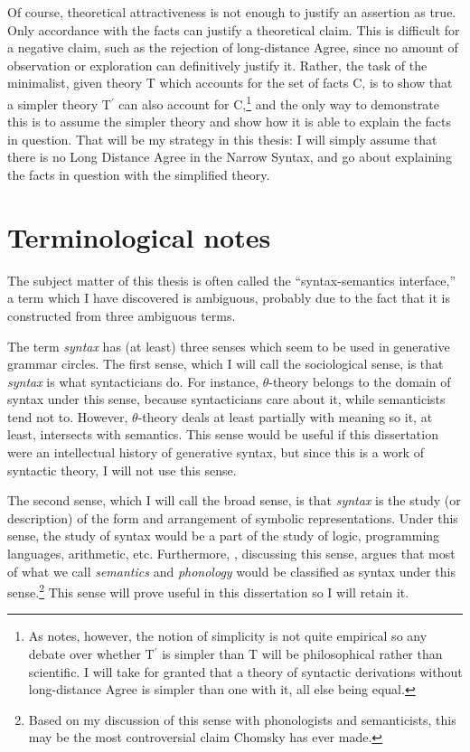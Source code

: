 \documentclass[MilwayThesis]{subfiles}
\begin{document}
Of course, theoretical attractiveness is not enough to justify an assertion as true.
Only accordance with the facts can justify a theoretical claim.
This is difficult for a negative claim, such as the rejection of long-distance Agree, since no amount of observation or exploration can definitively justify it.
Rather, the task of the minimalist, given theory T which accounts for the set of facts C, is to show that a simpler theory T$^\prime$ can also account for C,\footnote{
As \textcite{chomsky1965aspects} notes, however, the notion of simplicity is not quite empirical so any debate over whether T$^\prime$ is simpler than T will be philosophical rather than scientific.
I will take for granted that a theory of syntactic derivations without long-distance Agree is simpler than one with it, all else being equal.}
 and the only way to demonstrate this is to assume the simpler theory and show how it is able to explain the facts in question.
That will be my strategy in this thesis: I will simply assume that there is no Long Distance Agree in the Narrow Syntax, and go about explaining the facts in question with the simplified theory.
\section{Terminological notes}
The subject matter of this thesis is often called the ``syntax-semantics interface,'' a term which I have discovered is ambiguous, probably due to the fact that it is constructed from three ambiguous terms.

The term \textit{syntax} has (at least) three senses which seem to be used in generative grammar circles.
The first sense, which I will call the sociological sense, is that \textit{syntax} is what syntacticians do.
For instance, $\theta$-theory belongs to the domain of syntax under this sense, because syntacticians care about it, while semanticists tend not to.
However, $\theta$-theory deals at least partially with meaning so it, at least, intersects with semantics.
This sense would be useful if this dissertation were an intellectual history of generative syntax, but since this is a work of syntactic theory, I will not use this sense.

The second sense, which I will call the broad sense, is that \textit{syntax} is the study (or description) of the form and arrangement of symbolic representations.
Under this sense, the study of syntax would be a part of the study of logic, programming languages, arithmetic, etc.
Furthermore, \textcite[174]{chomsky2000new}, discussing this sense, argues that most of what we call \textit{semantics} and \textit{phonology} would be classified as syntax under this sense.\footnote{Based on my discussion of this sense with phonologists and semanticists, this may be the most controversial claim Chomsky has ever made.}
This sense will prove useful in this dissertation so I will retain it.
\end{document}
